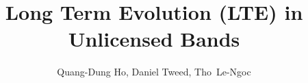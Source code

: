 \documentclass[graybox,envcountchap,sectrefs]{svmono}
\begin{document}
\author{Quang-Dung Ho, Daniel Tweed, \mbox{Tho Le-Ngoc}}
\title{Long Term Evolution (LTE) in Unlicensed Bands}
\maketitle

\frontmatter%

%
%


%
%
\tableofcontents
%


\mainmatter%
%







%

%
%

\end{document}
